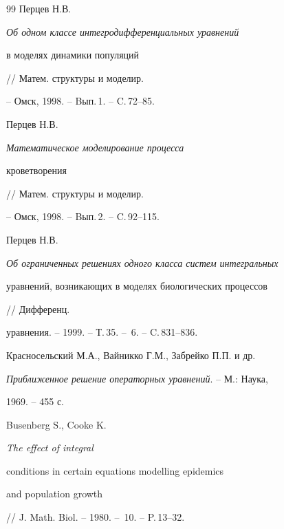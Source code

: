 \begin{thebibliography}{99}
Перцев Н.В. {\em Об одном классе интегродифференциальных уравнений 


в моделях динамики популяций} // Матем. структуры и моделир.


-- Омск, 1998. -- Bып.\,1. -- C.\,72--85.




Перцев Н.В. {\em Математическое моделирование процесса


кроветворения} // Матем. структуры и моделир.


-- Омск, 1998. -- Bып.\,2. -- C.\,92--115.




Перцев Н.В. {\em Об ограниченных решениях одного класса систем интегральных


уравнений, возникающих в моделях биологических процессов} // Дифференц.


уравнения. -- 1999. -- Т.\,35. -- \No\,6. -- C.\,831--836.




Красносельский М.А., Вайникко Г.М., Забрейко П.П. и др.


{\em Приближенное решение операторных уравнений}. -- М.: Наука,


1969. -- 455 с.




Busenberg S., Cooke K. {\em The effect of integral 


conditions in certain equations modelling epidemics 


and population growth} // J. Math. Biol. -- 1980. -- \No\,10. -- P.\,13--32.





\end{thebibliography}





\vskip 2cm












\label{end}





